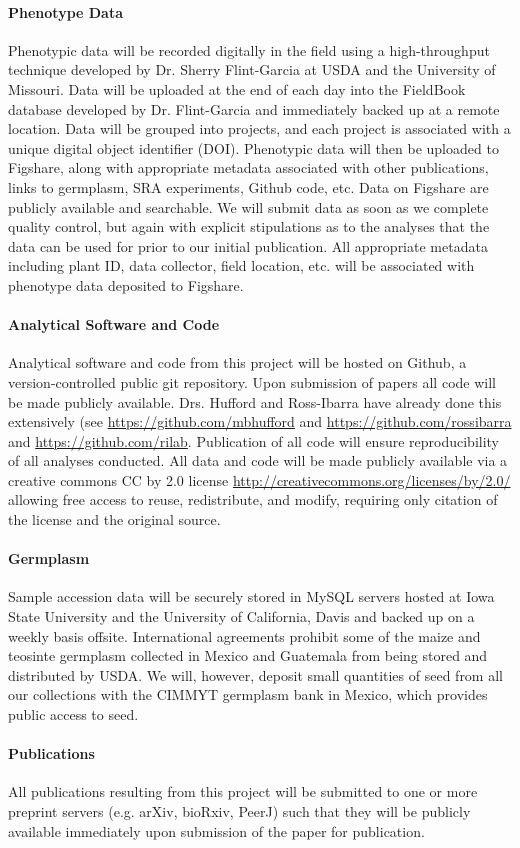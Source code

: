 \paragraph{Phenotype Data} 
Phenotypic data will be recorded digitally in the field using a high-throughput technique developed by Dr. Sherry Flint-Garcia at USDA and the University of Missouri.  Data will be uploaded at the end of each day into the FieldBook database developed by Dr. Flint-Garcia and immediately backed up at a remote location. Data will be grouped into projects, and each project is associated with a unique digital object identifier (DOI). Phenotypic data will then be uploaded to Figshare, along with appropriate metadata associated with other publications, links to germplasm, SRA experiments, Github code, etc.  Data on Figshare are publicly available and searchable.  We will submit data as soon as we complete quality control, but again with explicit stipulations as to the analyses that the data can be used for prior to our initial publication. All appropriate metadata including plant ID, data collector, field location, etc. will be associated with phenotype data deposited to Figshare. 

\paragraph{Analytical Software and Code} 
Analytical software and code from this project will be hosted on Github, a version-controlled public git repository.  Upon submission of papers all code will be made publicly available.  Drs. Hufford and Ross-Ibarra have already done this extensively (see \url{https://github.com/mbhufford} and \url{https://github.com/rossibarra} and \url{https://github.com/rilab}. Publication of all code will ensure reproducibility of all analyses conducted.  All data and code will be made publicly available via a creative commons CC by 2.0 license \url{http://creativecommons.org/licenses/by/2.0/} allowing free access to reuse, redistribute, and modify, requiring only citation of the license and the original source.

\paragraph{Germplasm} 
Sample accession data will be securely stored in MySQL servers hosted at Iowa State University and the University of California, Davis and backed up on a weekly basis offsite.  International agreements prohibit some of the maize and teosinte germplasm collected in Mexico and Guatemala from being stored and distributed by USDA.  We will, however, deposit small quantities of seed from all our collections with the CIMMYT germplasm bank in Mexico, which provides public access to seed.

\paragraph{Publications} 
All publications resulting from this project will be submitted to one or more preprint servers (e.g. arXiv, bioRxiv, PeerJ) such that they will be publicly available immediately upon submission of the paper for publication.